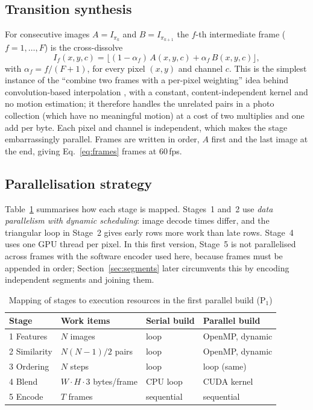 \documentclass[conference]{IEEEtran}
\begin{document}
\subsection{Transition synthesis}
For consecutive images $A=I_{\pi_k}$ and $B=I_{\pi_{k+1}}$ the $f$-th intermediate frame ($f=1,\dots,F$) is the cross-dissolve
\begin{equation}
  I_f(x,y,c)=\big\lfloor (1-\alpha_f)\,A(x,y,c)+\alpha_f\,B(x,y,c)\big\rfloor,
  \label{eq:blend}
\end{equation}
with $\alpha_f=f/(F+1)$, for every pixel $(x,y)$ and channel $c$. This is the simplest instance of the ``combine two frames with a per-pixel weighting'' idea behind convolution-based interpolation \cite{niklaus2017}, with a constant, content-independent kernel and no motion estimation; it therefore handles the unrelated pairs in a photo collection (which have no meaningful motion) at a cost of two multiplies and one add per byte. Each pixel and channel is independent, which makes the stage embarrassingly parallel. Frames are written in order, $A$ first and the last image at the end, giving Eq.~\eqref{eq:frames} frames at $60$\,fps.

\subsection{Parallelisation strategy}
Table~\ref{tab:strategy} summarises how each stage is mapped. Stages~1 and~2 use \emph{data parallelism with dynamic scheduling}: image decode times differ, and the triangular loop in Stage~2 gives early rows more work than late rows. Stage~4 uses one GPU thread per pixel. In this first version, Stage~5 is not parallelised across frames with the software encoder used here, because frames must be appended in order; Section~\ref{sec:segments} later circumvents this by encoding independent segments and joining them.

\begin{table}[t]
\caption{Mapping of stages to execution resources in the first parallel build (P$_1$)}
\label{tab:strategy}
\centering
\footnotesize
\begin{tabular}{@{}llll@{}}
\toprule
Stage & Work items & Serial build & Parallel build \\
\midrule
1 Features & $N$ images & loop & OpenMP, dynamic \\
2 Similarity & $N(N{-}1)/2$ pairs & loop & OpenMP, dynamic \\
3 Ordering & $N$ steps & loop & loop (same) \\
4 Blend & $W{\cdot}H{\cdot}3$ bytes/frame & CPU loop & CUDA kernel \\
5 Encode & $T$ frames & sequential & sequential \\
\bottomrule
\end{tabular}
\end{table}
\end{document}
